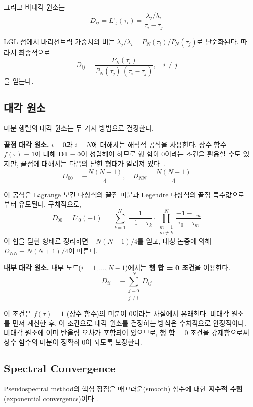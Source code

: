 \documentclass[11pt]{article}
\begin{document}
그리고 비대각 원소는
\[
D_{ij} = L'_j(\tau_i) = \frac{\lambda_j / \lambda_i}{\tau_i - \tau_j}
\]

LGL 점에서 바리센트릭 가중치의 비는 $\lambda_j / \lambda_i = P_N(\tau_i) / P_N(\tau_j)$로 단순화된다. 따라서 최종적으로
\[
D_{ij} = \frac{P_N(\tau_i)}{P_N(\tau_j)\, (\tau_i - \tau_j)}, \quad i \neq j
\]
을 얻는다.

\subsection{대각 원소}
\label{sec:diagonal}

미분 행렬의 대각 원소는 두 가지 방법으로 결정한다.

\textbf{끝점 대각 원소.} $i = 0$과 $i = N$에 대해서는 해석적 공식을 사용한다. 상수 함수 $f(\tau) = 1$에 대해 $\mathbf{D} \mathbf{1} = \mathbf{0}$이 성립해야 하므로 행 합이 0이라는 조건을 활용할 수도 있지만, 끝점에 대해서는 다음의 닫힌 형태가 알려져 있다~\cite{Rao2025}.
\begin{equation}
\label{eq:corner}
D_{00} = -\frac{N(N+1)}{4}, \quad D_{NN} = \frac{N(N+1)}{4}
\end{equation}

이 공식은 Lagrange 보간 다항식의 끝점 미분과 Legendre 다항식의 끝점 특수값으로부터 유도된다. 구체적으로,
\[
D_{00} = L'_0(-1) = \sum_{\substack{k=1}}^{N} \frac{1}{-1 - \tau_k} \cdot \prod_{\substack{m=1 \\ m \neq k}}^{N} \frac{-1 - \tau_m}{\tau_0 - \tau_m}
\]
이 합을 닫힌 형태로 정리하면 $-N(N+1)/4$를 얻고, 대칭 논증에 의해 $D_{NN} = N(N+1)/4$이 따른다.

\textbf{내부 대각 원소.} 내부 노드($i = 1, \ldots, N-1$)에서는 \textbf{행 합 = 0 조건}을 이용한다.
\[
D_{ii} = -\sum_{\substack{j=0 \\ j \neq i}}^{N} D_{ij}
\]

이 조건은 $f(\tau) = 1$ (상수 함수)의 미분이 0이라는 사실에서 유래한다. 비대각 원소를 먼저 계산한 후, 이 조건으로 대각 원소를 결정하는 방식은 수치적으로 안정적이다. 비대각 원소에 이미 반올림 오차가 포함되어 있으므로, 행 합 = 0 조건을 강제함으로써 상수 함수의 미분이 정확히 0이 되도록 보장한다.

\subsection{Spectral Convergence}
\label{sec:spectral}

Pseudospectral method의 핵심 장점은 매끄러운(smooth) 함수에 대한 \textbf{지수적 수렴}(exponential convergence)이다~\cite{Canuto2006}.
\end{document}
